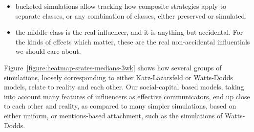 \documentclass[10pt,oneside]{memoir}
\begin{document}
\begin{Spacing}{2}
\begin{itemize}
\item bucketed simulations allow tracking how composite strategies apply to separate classes, or any combination of classes, either preserved or simulated.




\item the middle class is the real influencer, and it is anything but accidental.  For the kinds of effects which matter, these are the real non-accidental influentials we should care about.



\end{itemize}

Figure~\ref{figure:heatmap-srates-medians-3wk} shows how several groups of simulations, loosely corresponding to either Katz-Lazarsfeld or Watts-Dodds models, relate to reality and each other.  Our social-capital based models, taking into account many features of influencers as effective communicators, end up close to each other and reality, as compared to many simpler simulations, based on either uniform, or mentions-based attachment, such as the simulations of Watts-Dodds.




\end{Spacing}
\end{document}
